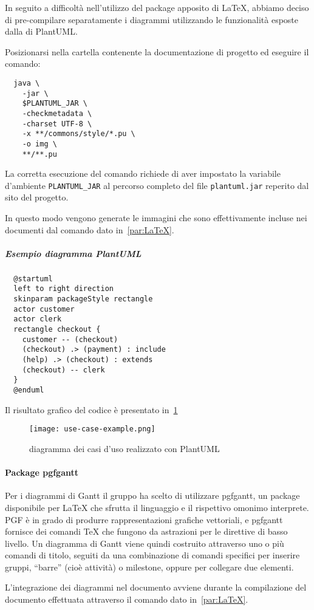 \documentclass[../../norme-di-progetto.tex]{subfiles}
\begin{document}
In seguito a difficoltà nell'utilizzo del package apposito di \LaTeX{}, abbiamo deciso di pre-compilare separatamente i diagrammi utilizzando le funzionalità esposte dalla  di PlantUML\@.

Posizionarsi nella cartella contenente la documentazione di progetto ed eseguire il comando:

\begin{verbatim}
  java \
    -jar \
    $PLANTUML_JAR \
    -checkmetadata \
    -charset UTF-8 \
    -x **/commons/style/*.pu \
    -o img \
    **/**.pu
\end{verbatim}

La corretta esecuzione del comando richiede di aver impostato la variabile d'ambiente \verb|PLANTUML_JAR| al percorso completo del file \verb|plantuml.jar| reperito dal sito del progetto.

In questo modo vengono generate le immagini che sono effettivamente incluse nei documenti dal comando dato in~\ref{par:LaTeX}.

\subparagraph{Esempio diagramma PlantUML}%
\label{subp:esempio_diagramma_plantuml}

\begin{verbatim}
  @startuml
  left to right direction
  skinparam packageStyle rectangle
  actor customer
  actor clerk
  rectangle checkout {
    customer -- (checkout)
    (checkout) .> (payment) : include
    (help) .> (checkout) : extends
    (checkout) -- clerk
  }
  @enduml
\end{verbatim}

Il risultato grafico del codice è presentato in~\ref{fig:esempio_caso_duso}

\begin{figure}[H]%
  \label{fig:esempio_caso_duso}
  \texttt{[image: use-case-example.png]}
  \centering
  \caption{diagramma dei casi d'uso realizzato con PlantUML}
\end{figure}


\paragraph{Package pgfgantt}%
\label{par:pgfgantt}

Per i diagrammi di Gantt il gruppo ha scelto di utilizzare pgfgantt, un package disponibile per \LaTeX{} che sfrutta il linguaggio  e il rispettivo omonimo interprete.
PGF è in grado di produrre rappresentazioni grafiche vettoriali, e pgfgantt fornisce dei comandi \TeX{} che fungono da astrazioni per le direttive di basso livello.
Un diagramma di Gantt viene quindi costruito attraverso uno o più comandi di titolo, seguiti da una combinazione di comandi specifici per inserire gruppi, ``barre'' (cioè attività) o milestone, oppure per collegare due elementi.

L'integrazione dei diagrammi nel documento avviene durante la compilazione del documento effettuata attraverso il comando dato in~\ref{par:LaTeX}.

\end{document}
